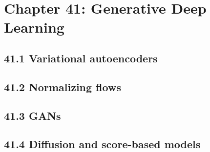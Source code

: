 \section{Chapter 41: Generative Deep Learning}

\subsection{41.1 Variational autoencoders}

\subsection{41.2 Normalizing flows}

\subsection{41.3 GANs}

\subsection{41.4 Diffusion and score-based models}

\clearpage
